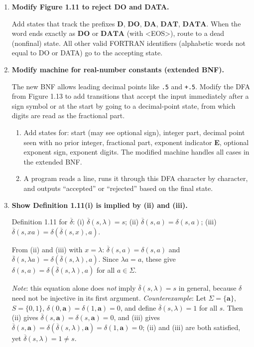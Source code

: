 \documentclass[11pt]{book}
\def\DBAR{\ensuremath{\overline{\delta}}}
\begin{document}
\begin{enumerate}[{1.}1.]
\item \textbf{Modify Figure 1.11 to reject DO and DATA.}

Add states that track the prefixes $\mathbf{D}$, $\mathbf{DO}$, $\mathbf{DA}$, $\mathbf{DAT}$, $\mathbf{DATA}$. When the word ends exactly as $\mathbf{DO}$ or $\mathbf{DATA}$ (with \textless EOS\textgreater), route to a dead (nonfinal) state. All other valid FORTRAN identifiers (alphabetic words not equal to DO or DATA) go to the accepting state.

\item \textbf{Modify machine for real-number constants (extended BNF).}

The new BNF allows leading decimal points like \texttt{.5} and \texttt{+.5}. Modify the DFA from Figure 1.13 to add transitions that accept the input immediately after a sign symbol or at the start by going to a decimal-point state, from which digits are read as the fractional part.

\begin{enumerate}
\item Add states for: start (may see optional sign), integer part, decimal point seen with no prior integer, fractional part, exponent indicator \textbf{E}, optional exponent sign, exponent digits. The modified machine handles all cases in the extended BNF.

\item A program reads a line, runs it through this DFA character by character, and outputs ``accepted'' or ``rejected'' based on the final state.
\end{enumerate}

\item \textbf{Show Definition 1.11(i) is implied by (ii) and (iii).}

Definition 1.11 for $\DBAR$: (i) $\DBAR(s,\lambda)=s$; (ii) $\DBAR(s,a)=\delta(s,a)$; (iii) $\DBAR(s,xa)=\delta(\DBAR(s,x),a)$.

From (ii) and (iii) with $x=\lambda$: $\DBAR(s,a) = \delta(s,a)$ and $\DBAR(s,\lambda a) = \delta(\DBAR(s,\lambda),a)$.
Since $\lambda a = a$, these give $\delta(s,a) = \delta(\DBAR(s,\lambda),a)$ for all $a\in\Sigma$.

\textit{Note}: this equation alone does \emph{not} imply $\DBAR(s,\lambda)=s$ in general, because $\delta$ need not be injective in its first argument.
\textit{Counterexample}: Let $\Sigma=\{\mathbf{a}\}$, $S=\{0,1\}$, $\delta(0,\mathbf{a})=\delta(1,\mathbf{a})=0$, and define $\DBAR(s,\lambda)=1$ for all $s$.
Then (ii) gives $\DBAR(s,\mathbf{a})=\delta(s,\mathbf{a})=0$, and (iii) gives $\DBAR(s,\mathbf{a})=\delta(\DBAR(s,\lambda),\mathbf{a})=\delta(1,\mathbf{a})=0$; (ii) and (iii) are both satisfied, yet $\DBAR(s,\lambda)=1\neq s$.


\end{enumerate}
\end{document}
